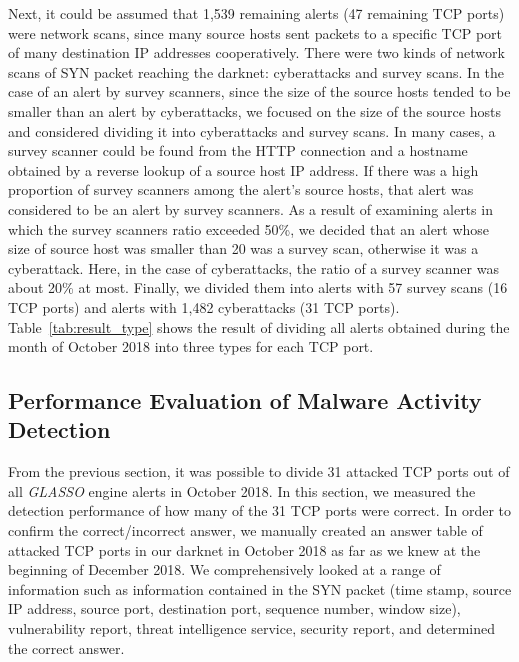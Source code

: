 \documentclass[conference]{IEEEtran}
\begin{document}
Next, it could be assumed that 1,539 remaining alerts (47 remaining TCP ports) were network scans, since many source hosts sent packets to a specific TCP port of many destination IP addresses cooperatively.
There were two kinds of network scans of SYN packet reaching the darknet: cyberattacks and survey scans.
In the case of an alert by survey scanners, since the size of the source hosts tended to be smaller than an alert by cyberattacks, we focused on the size of the source hosts and considered dividing it into cyberattacks and survey scans.
In many cases, a survey scanner could be found from the HTTP connection and a hostname obtained by a reverse lookup of a source host IP address.
If there was a high proportion of survey scanners among the alert's source hosts, that alert was considered to be an alert by survey scanners.
As a result of examining alerts in which the survey scanners ratio exceeded 50\%, we decided that an alert whose size of source host was smaller than 20 was a survey scan, otherwise it was a cyberattack.
Here, in the case of cyberattacks, the ratio of a survey scanner was about 20\% at most.
Finally, we divided them into alerts with 57 survey scans (16 TCP ports) and alerts with 1,482 cyberattacks (31 TCP ports).
Table~\ref{tab:result_type} shows the result of dividing all alerts obtained during the month of October 2018 into three types for each TCP port.







\subsection{Performance Evaluation of Malware Activity Detection}
From the previous section, it was possible to divide 31 attacked TCP ports out of all {\it GLASSO} engine alerts in October 2018.
In this section, we measured the detection performance of how many of the 31 TCP ports were correct.
In order to confirm the correct/incorrect answer, we manually created an answer table of attacked TCP ports in our darknet in October 2018 as far as we knew at the beginning of December 2018.
We comprehensively looked at a range of information such as information contained in the SYN packet (time stamp, source IP address, source port, destination port, sequence number, window size), vulnerability report, threat intelligence service, security report, and determined the correct answer.
\end{document}
